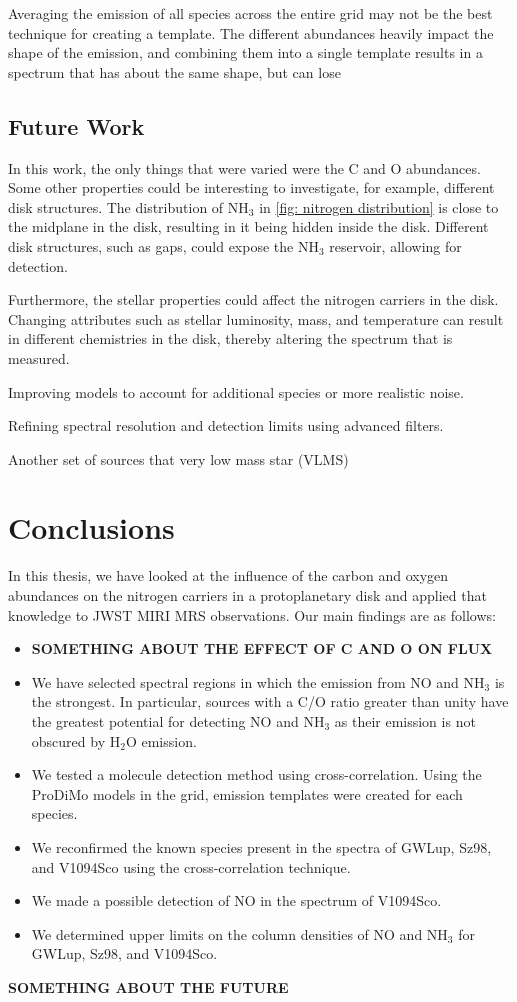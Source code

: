 \documentclass[oneside, single, authoryear, semicolon, 12pt]{lion-msc}
\newcommand{\4}{$_4$}
\newcommand{\3}{$_3$}
\newcommand{\2}{$_2$}
\begin{document}
Averaging the emission of all species across the entire grid may not be the best technique for creating a template. The different abundances heavily impact the shape of the emission, and combining them into a single template results in a spectrum that has about the same shape, but can lose 

\section{Future Work}
In this work, the only things that were varied were the C and O abundances. Some other properties could be interesting to investigate, for example, different disk structures. The distribution of NH\3 in \autoref{fig: nitrogen distribution} is close to the midplane in the disk, resulting in it being hidden inside the disk. Different disk structures, such as gaps, could expose the NH\3 reservoir, allowing for detection. 

Furthermore, the stellar properties could affect the nitrogen carriers in the disk. Changing attributes such as stellar luminosity, mass, and temperature can result in different chemistries in the disk, thereby altering the spectrum that is measured. 

Improving models to account for additional species or more realistic noise.

Refining spectral resolution and detection limits using advanced filters.

Another set of sources that very low mass star (VLMS) \citep{Arabhavi_2024}

\chapter{Conclusions}\label{Ch: Conclusions}
In this thesis, we have looked at the influence of the carbon and oxygen abundances on the nitrogen carriers in a protoplanetary disk and applied that knowledge to JWST MIRI MRS observations. Our main findings are as follows:
\begin{itemize}
    \item \textbf{SOMETHING ABOUT THE EFFECT OF C AND O ON FLUX}
    \item We have selected spectral regions in which the emission from NO and NH\3 is the strongest. In particular, sources with a C/O ratio greater than unity have the greatest potential for detecting NO and NH\3 as their emission is not obscured by H\2O emission.
    \item We tested a molecule detection method using cross-correlation. Using the ProDiMo models in the grid, emission templates were created for each species. 
    \item We reconfirmed the known species present in the spectra of GWLup, Sz98, and V1094Sco using the cross-correlation technique.
    \item We made a possible detection of NO in the spectrum of V1094Sco.
    \item We determined upper limits on the column densities of NO and NH\3 for GWLup, Sz98, and V1094Sco.
\end{itemize}
\textbf{SOMETHING ABOUT THE FUTURE}
\end{document}

